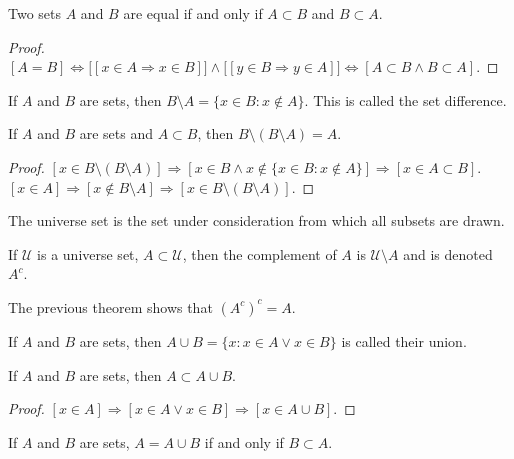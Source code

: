 \documentclass[crop=false,class=article,oneside]{standalone}
\begin{document}
        \begin{theorem}
        Two sets $A$ and $B$ are equal if and only if $A\subset B$ and $B\subset A$.
        \end{theorem}
        \begin{proof}
        $[A=B]\Leftrightarrow\big[[x\in A \Rightarrow x\in B]\big]\land \big[[y\in B \Rightarrow y\in A]\big]\Leftrightarrow [A\subset B\land B\subset A]$. 
        \end{proof}
        \begin{definition}
        If $A$ and $B$ are sets, then $B\setminus A = \{x\in B:x\notin A\}$. This is called the set difference.
        \end{definition}
        \begin{theorem}
        If $A$ and $B$ are sets and $A\subset B$, then $B\setminus(B\setminus A)=A$.
        \end{theorem}
        \begin{proof}
        $[x\in B\setminus(B\setminus A)]\Rightarrow [x\in B \land x\notin \{x\in B:x\notin A\}]\Rightarrow [x\in A\subset B]$. $[x\in A]\Rightarrow [x\notin B\setminus A]\Rightarrow [x\in B\setminus(B\setminus A)]$.
        \end{proof}
        \begin{definition}
        The universe set is the set under consideration from which all subsets are drawn.
        \end{definition}
        \begin{definition}
        If $\mathcal{U}$ is a universe set, $A\subset \mathcal{U}$, then the complement of $A$ is $\mathcal{U}\setminus A$ and is denoted $A^c$.
        \end{definition}
        \begin{remark}
        The previous theorem shows that $(A^c)^c = A$.
        \end{remark}
        \begin{definition}
        If $A$ and $B$ are sets, then $A\cup B = \{x: x\in A \lor x\in B\}$ is called their union.
        \end{definition}
        \begin{corollary}
        If $A$ and $B$ are sets, then $A\subset A\cup B$.
        \end{corollary}
        \begin{proof}
        $[x\in A]\Rightarrow [x\in A\lor x\in B]\Rightarrow [x\in A\cup B]$.
        \end{proof}
        \begin{theorem}
        If $A$ and $B$ are sets, $A=A\cup B$ if and only if $B\subset A$.
        \end{theorem}
\end{document}
